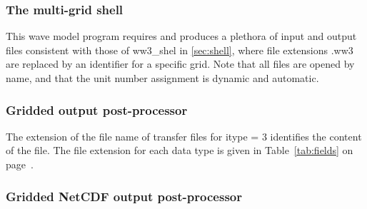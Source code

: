 

\pb
\vsssub
\subsubsection{The multi-grid shell} \label{sec:multi}
\vsssub


\vspace{\baselineskip}
\noindent
This wave model program requires and produces a plethora of input and output
files consistent with those of {\file ww3\_shel} in \para\ref{sec:shell},
where file extensions {\file .ww3} are replaced by an identifier for a
specific grid. Note that all files are opened by name, and that the unit
number assignment is dynamic and automatic.


\pb
\vsssub
\subsubsection{Gridded output post-processor} \label{sec:post_f}
\vsssub



\vspace{\baselineskip} 
\noindent
The extension of the file name of transfer files for {\F itype = 3} identifies
the content of the file. The file extension for each data type is given in
Table~\ref{tab:fields} on page~\pageref{tab:fields}.

\pb
\vsssub
\subsubsection{Gridded NetCDF output post-processor} \label{sec:post_ncf}
\vsssub

